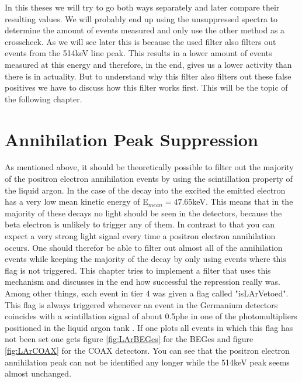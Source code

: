 \documentclass[encoding=utf8,british]{tumphthesis}
\begin{document}
In this theses we will try to go both ways separately and later compare their resulting values.
We will probably end up using the unsuppressed spectra to determine the amount of events measured and only use the other method as a crosscheck.
As we will see later this is because the used filter also filters out events from the 514keV line peak.
This results in a lower amount of events measured at this energy and therefore, in the end, gives us a lower activity than there is in actuality. 
But to understand why this filter also filters out these false positives we have to discuss how this filter works first.
This will be the topic of the following chapter.
\\

\section{Annihilation Peak Suppression}
\label{sec:APS}

As mentioned above, it should be theoretically possible to filter out the majority of the positron electron annihilation events by using the scintillation property of the liquid argon.
In the case of the \Kr decay into the excited  the emitted electron has a very low mean kinetic energy of E\(_{mean}=47.65\)keV.
This means that in the majority of these decays no light should be seen in the detectors, because the beta electron is unlikely to trigger any of them.
In contrast to that you can expect a very strong light signal every time a positron electron annihilation occurs. 
One should therefor be able to filter out almost all of the annihilation events while keeping the majority of the \Kr decay by only using events where this flag is not triggered.
This chapter tries to implement a filter that uses this mechanism and discusses in the end how successful the repression really was.
\\

Among other things, each event in tier 4 was given a flag called "isLArVetoed".
This flag is always triggered whenever an event in the Germanium detectors coincides with a scintillation signal of about 0.5phe in one of the photomultipliers positioned in the liquid argon tank \cite{agostini_allardt_bakalyarov_barabanov_baudis_bauer_bellotti_belogurov_belyaev_benato_et al._2017}.
If one plots all events in which this flag has not been set one gets figure \ref{fig:LArBEGes} for the BEGes and figure \ref{fig:LArCOAX} for the COAX detectors.
You can see that the positron electron annihilation peak can not be identified any longer while the 514keV peak seems almost unchanged.
\\
\end{document}
